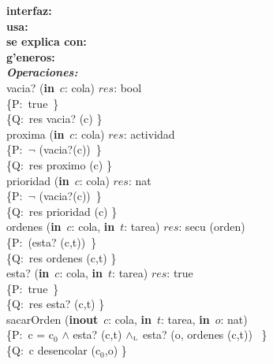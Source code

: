 \documentclass[a4paper,10pt]{article}
\begin{document}
\indent \noindent \textbf{interfaz:} \\
\indent \textbf{usa:}\\
\indent \textbf{se explica con:} \\
\indent \textbf{g'eneros:} \\

\noindent \textbf{\textsl{Operaciones:}}\\

\noindent vacia? (\textbf{in}\ $c$: cola) \en $res$: bool \ \ \ \ \ \\
\indent \{P:\ true\ \}  \\
\indent \{Q:\ res \igobs vacia? (c) \}\\

\noindent proxima (\textbf{in}\ $c$: cola) \en $res$: actividad \ \ \ \ \ \\
\indent \{P:\ $\neg$ (vacia?(c))\ \}  \\
\indent \{Q:\ res \igobs proximo (c) \}\\

\noindent prioridad (\textbf{in}\ $c$: cola) \en $res$: nat \ \ \ \ \ \\
\indent \{P:\ $\neg$ (vacia?(c))\ \}  \\
\indent \{Q:\ res \igobs prioridad (c) \}\\

\noindent ordenes (\textbf{in}\ $c$: cola, \textbf{in}\ $t$: tarea) \en $res$: secu (orden) \ \ \ \ \ \\
\indent \{P:\ (esta? (c,t))\ \}  \\
\indent \{Q:\ res \igobs ordenes (c,t) \}\\

\noindent esta? (\textbf{in}\ $c$: cola, \textbf{in}\ $t$: tarea) \en $res$: true \ \ \ \ \ \\
\indent \{P:\ true\ \}  \\
\indent \{Q:\ res \igobs esta? (c,t) \}\\

\noindent sacarOrden (\textbf{inout}\ $c$: cola, \textbf{in}\ $t$: tarea, \textbf{in}\ $o$: nat) \ \ \ \ \ \\
\indent \{P:\ c = c$_0$ $\wedge$ esta? (c,t) $\land_{\mathrm{\scriptscriptstyle{L}}}$ esta? (o, ordenes (c,t)) \ \}  \\
\indent \{Q:\ c \igobs desencolar (c$_0$,o) \}\\
\end{document}
